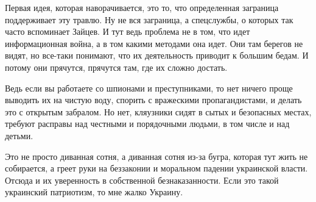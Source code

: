 Первая идея, которая наворачивается, это то, что определенная заграница
поддерживает эту травлю. Ну не вся заграница, а спецслужбы, о которых так часто
вспоминает Зайцев. И тут ведь проблема не в том, что идет информационная война,
а в том какими методами она идет. Они там берегов не видят, но все-таки
понимают, что их деятельность приводит к большим бедам. И потому они прячутся,
прячутся там, где их сложно достать.  

Ведь если вы работаете со шпионами и преступниками, то нет ничего проще
выводить их на чистую воду, спорить с вражескими пропагандистами, и делать это
с открытым забралом. Но нет, кляузники сидят в сытых и безопасных местах,
требуют расправы над честными и порядочными людьми, в том числе и над детьми.  

Это не просто диванная сотня, а диванная сотня из-за бугра, которая тут жить не
собирается, а греет руки на беззаконии и моральном падении украинской власти.
Отсюда и их уверенность в собственной безнаказанности. Если это такой
украинский патриотизм, то мне жалко Украину.

